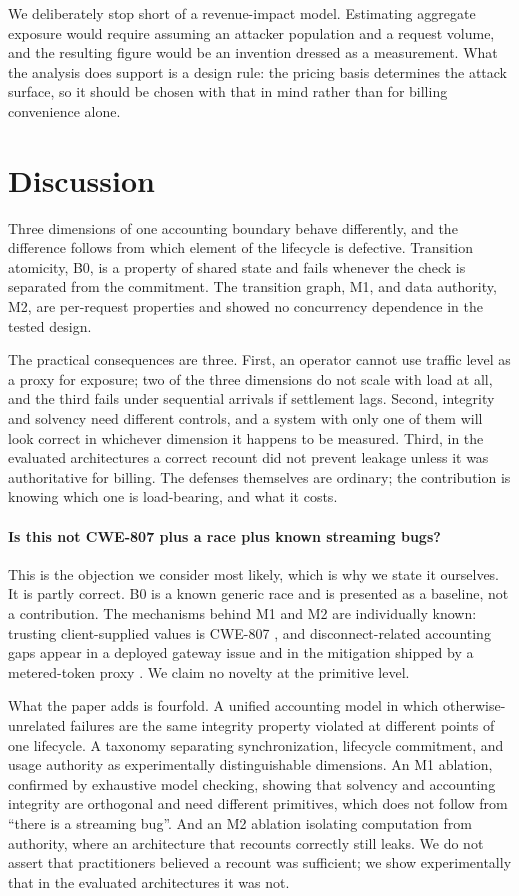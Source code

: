\documentclass[preprint,3p,authoryear,12pt]{elsarticle}
\begin{document}
We deliberately stop short of a revenue-impact model. Estimating aggregate exposure
would require assuming an attacker population and a request volume, and the resulting
figure would be an invention dressed as a measurement. What the analysis does support is
a design rule: the pricing basis determines the attack surface, so it should be chosen
with that in mind rather than for billing convenience alone.

\section{Discussion}
\label{sec:discussion}
Three dimensions of one accounting boundary behave differently, and the difference
follows from which element of the lifecycle is defective. Transition atomicity, B0, is a
property of shared state and fails whenever the check is separated from the commitment.
The transition graph, M1, and data authority, M2, are per-request properties and showed
no concurrency dependence in the tested design.

The practical consequences are three. First, an operator cannot use traffic level as a
proxy for exposure; two of the three dimensions do not scale with load at all, and the
third fails under sequential arrivals if settlement lags. Second, integrity and solvency
need different controls, and a system with only one of them will look correct in
whichever dimension it happens to be measured. Third, in the evaluated architectures a
correct recount did not prevent leakage unless it was authoritative for billing. The
defenses themselves are ordinary; the contribution is knowing which one is load-bearing,
and what it costs.

\paragraph{Is this not CWE-807 plus a race plus known streaming bugs?}
This is the objection we consider most likely, which is why we state it ourselves. It is
partly correct. B0 is a known generic race and is presented as a baseline, not a
contribution. The mechanisms behind M1 and M2 are individually known: trusting
client-supplied values is CWE-807 \citep{cwe807}, and disconnect-related accounting gaps
appear in a deployed gateway issue \citep{newapi5235} and in the mitigation shipped by a
metered-token proxy \citep{aperture247}. We claim no novelty at the primitive level.

What the paper adds is fourfold. A unified accounting model in which
otherwise-unrelated failures are the same integrity property violated at different
points of one lifecycle. A taxonomy separating synchronization, lifecycle commitment, and
usage authority as experimentally distinguishable dimensions. An M1 ablation, confirmed
by exhaustive model checking, showing that solvency and accounting integrity are
orthogonal and need different primitives, which does not follow from ``there is a
streaming bug''. And an M2 ablation isolating computation from authority, where an
architecture that recounts correctly still leaks. We do not assert that practitioners
believed a recount was sufficient; we show experimentally that in the evaluated
architectures it was not.
\end{document}
